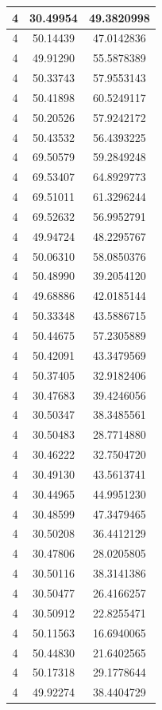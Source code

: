 \documentclass[
]{book}
\begin{document}
\begin{tabular}{c|c|c}
\hline
4 & 30.49954 & 49.3820998\\
\hline
4 & 50.14439 & 47.0142836\\
\hline
4 & 49.91290 & 55.5878389\\
\hline
4 & 50.33743 & 57.9553143\\
\hline
4 & 50.41898 & 60.5249117\\
\hline
4 & 50.20526 & 57.9242172\\
\hline
4 & 50.43532 & 56.4393225\\
\hline
4 & 69.50579 & 59.2849248\\
\hline
4 & 69.53407 & 64.8929773\\
\hline
4 & 69.51011 & 61.3296244\\
\hline
4 & 69.52632 & 56.9952791\\
\hline
4 & 49.94724 & 48.2295767\\
\hline
4 & 50.06310 & 58.0850376\\
\hline
4 & 50.48990 & 39.2054120\\
\hline
4 & 49.68886 & 42.0185144\\
\hline
4 & 50.33348 & 43.5886715\\
\hline
4 & 50.44675 & 57.2305889\\
\hline
4 & 50.42091 & 43.3479569\\
\hline
4 & 50.37405 & 32.9182406\\
\hline
4 & 30.47683 & 39.4246056\\
\hline
4 & 30.50347 & 38.3485561\\
\hline
4 & 30.50483 & 28.7714880\\
\hline
4 & 30.46222 & 32.7504720\\
\hline
4 & 30.49130 & 43.5613741\\
\hline
4 & 30.44965 & 44.9951230\\
\hline
4 & 30.48599 & 47.3479465\\
\hline
4 & 30.50208 & 36.4412129\\
\hline
4 & 30.47806 & 28.0205805\\
\hline
4 & 30.50116 & 38.3141386\\
\hline
4 & 30.50477 & 26.4166257\\
\hline
4 & 30.50912 & 22.8255471\\
\hline
4 & 50.11563 & 16.6940065\\
\hline
4 & 50.44830 & 21.6402565\\
\hline
4 & 50.17318 & 29.1778644\\
\hline
4 & 49.92274 & 38.4404729\\

\end{tabular}
\end{document}
